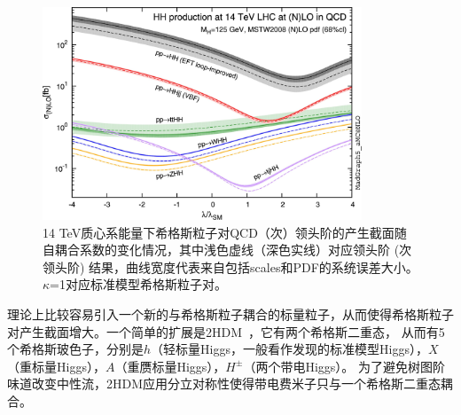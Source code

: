 \begin{figure}[h]
\centering
 \includegraphics[width=0.85\textwidth]{fig/HH_xs_kappa_14TeV.jpg}
  \caption{14 TeV质心系能量下希格斯粒子对QCD（次）领头阶的产生截面随自耦合系数的变化情况，其中浅色虚线（深色实线）对应领头阶 (次领头阶) 结果，曲线宽度代表来自包括scales和PDF的系统误差大小。 
  $\kappa$=1对应标准模型希格斯粒子对。}
  \label{fig:HH_xs_kappa_14TeV}
\end{figure}

理论上比较容易引入一个新的与希格斯粒子耦合的标量粒子，从而使得希格斯粒子对产生截面增大。一个简单的扩展是2HDM~\cite{2HDMTheory}，它有两个希格斯二重态，
从而有5个希格斯玻色子，分别是$h$（轻标量Higgs，一般看作发现的标准模型Higgs），$X$（重标量Higgs），$A$（重赝标量Higgs），$H^{\pm}$（两个带电Higgs）。
为了避免树图阶味道改变中性流，2HDM应用分立对称性使得带电费米子只与一个希格斯二重态耦合。

